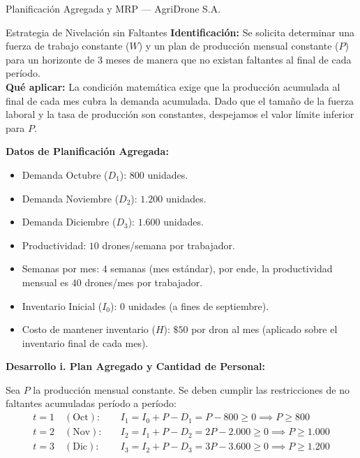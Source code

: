 \documentclass[11pt, a4paper]{article}
\begin{document}
\begin{ejercicio}{Planificación Agregada y MRP --- AgriDrone S.A.}
  \begin{tipprueba}{Estrategia de Nivelación sin Faltantes}
    \textbf{Identificación:} Se solicita determinar una fuerza de trabajo constante ($W$) y un plan de producción mensual constante ($P$) para un horizonte de 3 meses de manera que no existan faltantes al final de cada período. \\
    \textbf{Qué aplicar:} La condición matemática exige que la producción acumulada al final de cada mes cubra la demanda acumulada. Dado que el tamaño de la fuerza laboral y la tasa de producción son constantes, despejamos el valor límite inferior para $P$.
  \end{tipprueba}

  \textbf{Datos de Planificación Agregada:}
  \begin{itemize}
    \item Demanda Octubre ($D_1$): $800$ unidades.
    \item Demanda Noviembre ($D_2$): $1.200$ unidades.
    \item Demanda Diciembre ($D_3$): $1.600$ unidades.
    \item Productividad: $10$ drones/semana por trabajador.
    \item Semanas por mes: $4$ semanas (mes estándar), por ende, la productividad mensual es $40$ drones/mes por trabajador.
    \item Inventario Inicial ($I_0$): $0$ unidades (a fines de septiembre).
    \item Costo de mantener inventario ($H$): $\$50$ por dron al mes (aplicado sobre el inventario final de cada mes).
  \end{itemize}

  \medskip
  \textbf{Desarrollo i. Plan Agregado y Cantidad de Personal:}

  Sea $P$ la producción mensual constante. Se deben cumplir las restricciones de no faltantes acumuladas período a período:
  \begin{align*}
    t = 1 \quad (\text{Oct}): \quad & I_1 = I_0 + P - D_1 = P - 800 \ge 0 \implies P \ge 800 \\
    t = 2 \quad (\text{Nov}): \quad & I_2 = I_1 + P - D_2 = 2P - 2.000 \ge 0 \implies P \ge 1.000 \\
    t = 3 \quad (\text{Dic}): \quad & I_3 = I_2 + P - D_3 = 3P - 3.600 \ge 0 \implies P \ge 1.200
  \end{align*}


\end{ejercicio}
\end{document}
